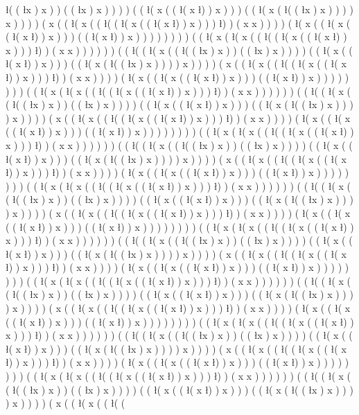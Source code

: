 \l ( ( \l x ) x ) ) ( ( \l x ) x ) ) ) ) ( ( \l ( x ( ( \l ( x \l ) ) x ) ) ) ( ( \l ( x ( \l ( ( \l x ) x ) ) ) ) x ) ) ) ) ( x ( ( \l ( x ( ( \l ( ( \l ( x ( ( \l ( x \l ) ) x ) ) ) \l ) ) ( x x ) ) ) ) ( \l ( x ( ( \l ( x ( ( \l ( x \l ) ) x ) ) ) ( ( \l ( x \l ) ) x ) ) ) ) ) ) ) ) ( ( \l ( x ( \l ( x ( ( \l ( ( \l ( x ( ( \l ( x \l ) ) x ) ) ) \l ) ) ( x x ) ) ) ) ) ) ( ( \l ( ( \l ( x ( ( \l ( ( \l x ) x ) ) ( ( \l x ) x ) ) ) ) ( ( \l ( x ( ( \l ( x \l ) ) x ) ) ) ( ( \l ( x ( \l ( ( \l x ) x ) ) ) ) x ) ) ) ) ( x ( ( \l ( x ( ( \l ( ( \l ( x ( ( \l ( x \l ) ) x ) ) ) \l ) ) ( x x ) ) ) ) ( \l ( x ( ( \l ( x ( ( \l ( x \l ) ) x ) ) ) ( ( \l ( x \l ) ) x ) ) ) ) ) ) ) ) ( ( \l ( x ( \l ( x ( ( \l ( ( \l ( x ( ( \l ( x \l ) ) x ) ) ) \l ) ) ( x x ) ) ) ) ) ) ( ( \l ( ( \l ( x ( ( \l ( ( \l x ) x ) ) ( ( \l x ) x ) ) ) ) ( ( \l ( x ( ( \l ( x \l ) ) x ) ) ) ( ( \l ( x ( \l ( ( \l x ) x ) ) ) ) x ) ) ) ) ( x ( ( \l ( x ( ( \l ( ( \l ( x ( ( \l ( x \l ) ) x ) ) ) \l ) ) ( x x ) ) ) ) ( \l ( x ( ( \l ( x ( ( \l ( x \l ) ) x ) ) ) ( ( \l ( x \l ) ) x ) ) ) ) ) ) ) ) ( ( \l ( x ( \l ( x ( ( \l ( ( \l ( x ( ( \l ( x \l ) ) x ) ) ) \l ) ) ( x x ) ) ) ) ) ) ( ( \l ( ( \l ( x ( ( \l ( ( \l x ) x ) ) ( ( \l x ) x ) ) ) ) ( ( \l ( x ( ( \l ( x \l ) ) x ) ) ) ( ( \l ( x ( \l ( ( \l x ) x ) ) ) ) x ) ) ) ) ( x ( ( \l ( x ( ( \l ( ( \l ( x ( ( \l ( x \l ) ) x ) ) ) \l ) ) ( x x ) ) ) ) ( \l ( x ( ( \l ( x ( ( \l ( x \l ) ) x ) ) ) ( ( \l ( x \l ) ) x ) ) ) ) ) ) ) ) ( ( \l ( x ( \l ( x ( ( \l ( ( \l ( x ( ( \l ( x \l ) ) x ) ) ) \l ) ) ( x x ) ) ) ) ) ) ( ( \l ( ( \l ( x ( ( \l ( ( \l x ) x ) ) ( ( \l x ) x ) ) ) ) ( ( \l ( x ( ( \l ( x \l ) ) x ) ) ) ( ( \l ( x ( \l ( ( \l x ) x ) ) ) ) x ) ) ) ) ( x ( ( \l ( x ( ( \l ( ( \l ( x ( ( \l ( x \l ) ) x ) ) ) \l ) ) ( x x ) ) ) ) ( \l ( x ( ( \l ( x ( ( \l ( x \l ) ) x ) ) ) ( ( \l ( x \l ) ) x ) ) ) ) ) ) ) ) ( ( \l ( x ( \l ( x ( ( \l ( ( \l ( x ( ( \l ( x \l ) ) x ) ) ) \l ) ) ( x x ) ) ) ) ) ) ( ( \l ( ( \l ( x ( ( \l ( ( \l x ) x ) ) ( ( \l x ) x ) ) ) ) ( ( \l ( x ( ( \l ( x \l ) ) x ) ) ) ( ( \l ( x ( \l ( ( \l x ) x ) ) ) ) x ) ) ) ) ( x ( ( \l ( x ( ( \l ( ( \l ( x ( ( \l ( x \l ) ) x ) ) ) \l ) ) ( x x ) ) ) ) ( \l ( x ( ( \l ( x ( ( \l ( x \l ) ) x ) ) ) ( ( \l ( x \l ) ) x ) ) ) ) ) ) ) ) ( ( \l ( x ( \l ( x ( ( \l ( ( \l ( x ( ( \l ( x \l ) ) x ) ) ) \l ) ) ( x x ) ) ) ) ) ) ( ( \l ( ( \l ( x ( ( \l ( ( \l x ) x ) ) ( ( \l x ) x ) ) ) ) ( ( \l ( x ( ( \l ( x \l ) ) x ) ) ) ( ( \l ( x ( \l ( ( \l x ) x ) ) ) ) x ) ) ) ) ( x ( ( \l ( x ( ( \l ( ( \l ( x ( ( \l ( x \l ) ) x ) ) ) \l ) ) ( x x ) ) ) ) ( \l ( x ( ( \l ( x ( ( \l ( x \l ) ) x ) ) ) ( ( \l ( x \l ) ) x ) ) ) ) ) ) ) ) ( ( \l ( x ( \l ( x ( ( \l ( ( \l ( x ( ( \l ( x \l ) ) x ) ) ) \l ) ) ( x x ) ) ) ) ) ) ( ( \l ( ( \l ( x ( ( \l ( ( \l x ) x ) ) ( ( \l x ) x ) ) ) ) ( ( \l ( x ( ( \l ( x \l ) ) x ) ) ) ( ( \l ( x ( \l ( ( \l x ) x ) ) ) ) x ) ) ) ) ( x ( ( \l ( x ( ( \l ( ( \l ( x ( ( \l ( x \l ) ) x ) ) ) \l ) ) ( x x ) ) ) ) ( \l ( x ( ( \l ( x ( ( \l ( x \l ) ) x ) ) ) ( ( \l ( x \l ) ) x ) ) ) ) ) ) ) ) ( ( \l ( x ( \l ( x ( ( \l ( ( \l ( x ( ( \l ( x \l ) ) x ) ) ) \l ) ) ( x x ) ) ) ) ) ) ( ( \l ( ( \l ( x ( ( \l ( ( \l x ) x ) ) ( ( \l x ) x ) ) ) ) ( ( \l ( x ( ( \l ( x \l ) ) x ) ) ) ( ( \l ( x ( \l ( ( \l x ) x ) ) ) ) x ) ) ) ) ( x ( ( \l ( x ( ( \l ( ( 